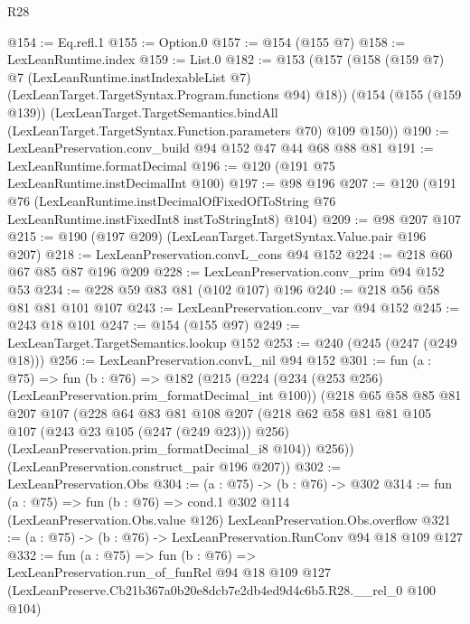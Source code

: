 \begin{lexlean}{R28}
\begin{coremodule}
@154 := Eq.refl.{1}
@155 := Option.{0}
@157 := @154 (@155 @7)
@158 := LexLeanRuntime.index
@159 := List.{0}
@182 := @153
    (@157
      (@158
        (@159 @7)
        @7
        (LexLeanRuntime.instIndexableList @7)
        (LexLeanTarget.TargetSyntax.Program.functions @94)
        @18))
    (@154
      (@155 (@159 @139))
      (LexLeanTarget.TargetSemantics.bindAll
        (LexLeanTarget.TargetSyntax.Function.parameters @70)
        @109
        @150))
@190 := LexLeanPreservation.conv_build @94 @152 @47 @44 @68 @88 @81
@191 := LexLeanRuntime.formatDecimal
@196 := @120 (@191 @75 LexLeanRuntime.instDecimalInt @100)
@197 := @98 @196
@207 := @120
    (@191
      @76
      (LexLeanRuntime.instDecimalOfFixedOfToString
        @76
        LexLeanRuntime.instFixedInt8
        instToStringInt8)
      @104)
@209 := @98 @207 @107
@215 := @190 (@197 @209) (LexLeanTarget.TargetSyntax.Value.pair @196 @207)
@218 := LexLeanPreservation.convL_cons @94 @152
@224 := @218 @60 @67 @85 @87 @196 @209
@228 := LexLeanPreservation.conv_prim @94 @152 @53
@234 := @228 @59 @83 @81 (@102 @107) @196
@240 := @218 @56 @58 @81 @81 @101 @107
@243 := LexLeanPreservation.conv_var @94 @152
@245 := @243 @18 @101
@247 := @154 (@155 @97)
@249 := LexLeanTarget.TargetSemantics.lookup @152
@253 := @240 (@245 (@247 (@249 @18)))
@256 := LexLeanPreservation.convL_nil @94 @152
@301 := fun (a : @75) =>
  fun (b : @76) =>
  @182
    (@215
      (@224
        (@234 (@253 @256) (LexLeanPreservation.prim_formatDecimal_int @100))
        (@218
          @65
          @58
          @85
          @81
          @207
          @107
          (@228
            @64
            @83
            @81
            @108
            @207
            (@218 @62 @58 @81 @81 @105 @107 (@243 @23 @105 (@247 (@249 @23))) @256)
            (LexLeanPreservation.prim_formatDecimal_i8 @104))
          @256))
      (LexLeanPreservation.construct_pair @196 @207))
@302 := LexLeanPreservation.Obs
@304 := (a : @75) -> (b : @76) -> @302
@314 := fun (a : @75) =>
  fun (b : @76) =>
  cond.{1} @302 @114 (LexLeanPreservation.Obs.value @126) LexLeanPreservation.Obs.overflow
@321 := (a : @75) -> (b : @76) -> LexLeanPreservation.RunConv @94 @18 @109 @127
@332 := fun (a : @75) =>
  fun (b : @76) =>
  LexLeanPreservation.run_of_funRel
    @94
    @18
    @109
    @127
    (LexLeanPreserve.Cb21b367a0b20e8dcb7e2db4ed9d4c6b5.R28.__rel_0 @100 @104)
\end{coremodule}
\end{lexlean}
